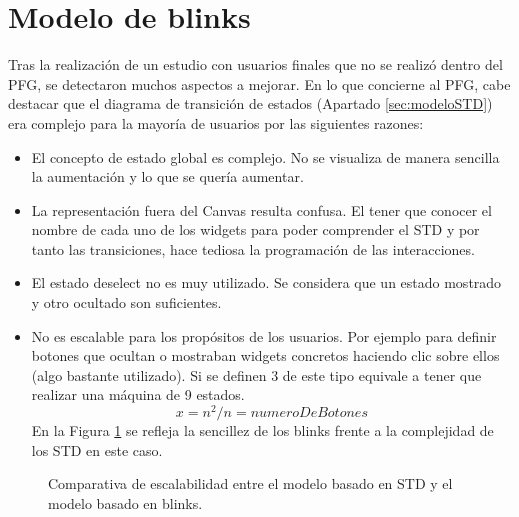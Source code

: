 \section{Modelo de blinks}
\label{sec:modeloBlinks}

Tras la realización de un estudio con usuarios finales que no se realizó dentro del PFG, se detectaron muchos aspectos a mejorar. En lo que concierne al PFG, cabe destacar que el diagrama de transición de estados (Apartado \ref{sec:modeloSTD}) era complejo para la mayoría de usuarios por las siguientes razones:
\begin{itemize}
\item{El concepto de estado global es complejo. No se visualiza de manera sencilla la aumentación y lo que se quería aumentar.}
\item{La representación fuera del Canvas resulta confusa. El tener que conocer el nombre de cada uno de los widgets para poder comprender el STD y por tanto las transiciones, hace tediosa la programación de las interacciones.}
\item{El estado deselect no es muy utilizado. Se considera que un estado mostrado y otro ocultado son suficientes.}
\item{No es escalable para los propósitos de los usuarios. Por ejemplo para definir botones que ocultan o mostraban widgets concretos haciendo clic sobre ellos (algo bastante utilizado). Si se definen 3 de este tipo equivale a tener que realizar una máquina de 9 estados. \[x=n^2 / n=numeroDeBotones\] En la Figura \ref{fig:EscalabilidadInteracciones} se refleja la sencillez de los blinks frente a la complejidad de los STD en este caso.}
\end{itemize}

\begin{figure}
\begin{center}
\caption{Comparativa de escalabilidad entre el modelo basado en STD y el modelo basado en blinks.}
\label{fig:EscalabilidadInteracciones}
\end{center}
\end{figure}

